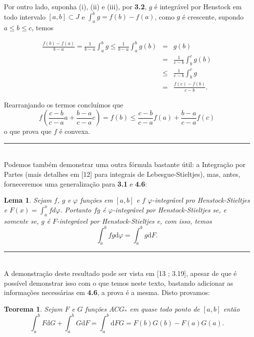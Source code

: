 \documentclass[12pt, a4paper]{article}
\newtheorem{lem}[mydef]{Lema}
\newtheorem{thrm}[mydef]{Teorema}
\def\eop{\hfill\rule{2.5mm}{2.5mm}}
\theoremstyle{definition}
\begin{document}
Por outro lado, suponha (i), (ii) e (iii), por \textbf{3.2}, $g$ é integrável por Henstock em todo intervalo $[a,b]\subset J$ e $\int_a^b g=f(b)-f(a)$, como $g$ é crescente, supondo $a\leq b\leq c$, temos 

$$\begin{array}{lll}

\displaystyle\frac{f(b)-f(a)}{b-a}= \displaystyle\frac{1}{b-a}\displaystyle\int_a^b g \leq  \displaystyle\frac{1}{b-a}\displaystyle\int_a^b g(b)& = & g(b) \\
\ & = &  \displaystyle\frac{1}{c-b}\displaystyle\int_b^c g(b) \\
\ & \leq & \displaystyle\frac{1}{c-b}\displaystyle\int_b^c g \\
\ & = &  \displaystyle\frac{f(c)-f(b)}{c-b}.
\end{array}$$ 

Rearranjando os termos concluímos que $$f\left(\frac{c-b}{c-a}a + \frac{b-a}{c-a}c  \right)=f(b)\leq \frac{c-b}{c-a} f(a) + \frac{b-a}{c-a} f(c)$$ o que prova que $f$ é convexa. \eop \\

Podemos também demonstrar uma outra fórmula bastante útil: a Integração por Partes (mais detalhes em [12] para integrais de Lebesgue-Stieltjes), mas, antes, forneceremos uma generalização para \textbf{3.1} e \textbf{4.6}:

\begin{lem}
	
	Sejam $f$, $g$ e $\varphi$ funções em $[a,b]$ e $f$ $\varphi$-integrável pro Henstock-Stieltjes e $F(x)=\int_a^x fd\varphi$. Portanto $fg$ é $\varphi$-integrável por Henstock-Stieltjes se, e somente se, $g$ é $F$-integrável por Henstock-Stieltjes e, com isso, temos $$\int_a^b fg  \text{d}\varphi =\int_a^b g \text{d}F.$$ 
	
\end{lem}

\eop \\

A demonstração deste resultado pode ser vista em [13 ; 3.19], apesar de que é possível demonstrar isso com o que temos neste texto, bastando adicionar as informações necessárias em \textbf{4.6}, a prova é a mesma. Disto provamos:

\begin{thrm}
	
	Sejam $F$ e $G$ funções $ACG_*$ em quase todo ponto de $[a,b]$ então $$\int_a^b F \text{d}G + \int_a^bG \text{d}F = \int_a^b  \text{d}FG=F(b)G(b) - F(a)G(a). $$ 
	
\end{thrm}
\end{document}
